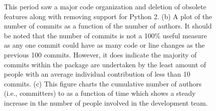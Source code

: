 \begin{figure}
{	This period saw a major code organization and deletion of obsolete features along with removing support for Python 2.
	(b) A plot of the number of commits as a function of the number of authors.
	It should be noted that the number of commits is not a 100\% useful measure as any one commit could have as many code or line changes as the previous 100 commits.
	However, it does indicate the majority of commits within the package are undertaken by the least amount of people with an average individual contribution of less than 10 commits.
	(c) This figure charts the cumulative number of authors (i.e., committers) to \sunpypkg as a function of time which shows a steady increase in the number of people involved in the development team.
}
\label{fig:metafig}
\end{figure}
